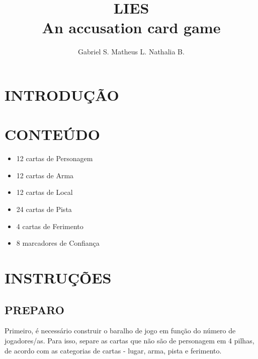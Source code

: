 \documentclass[a4paper, 11pt]{article}
\title{\textbf{LIES} \\ \small{An accusation card game}}
\author{Gabriel S. Matheus L. Nathalia B.}
\begin{document}
\maketitle

\newpage

\newpage

\section*{INTRODUÇÃO}


\section*{CONTEÚDO}

	\begin{itemize}

	\item 12 cartas de Personagem

	\item 12 cartas de Arma

	\item 12 cartas de Local

	\item 24 cartas de Pista

	\item 4 cartas de Ferimento

	\item 8 marcadores de Confiança

	\end{itemize}

\section*{INSTRUÇÕES}

\vspace{5mm}


\subsection*{PREPARO}

	Primeiro, é necessário construir o baralho de jogo em função do número de jogadores/as. Para isso, separe as cartas que não são de personagem em 4 pilhas, de acordo com as categorias de cartas - lugar, arma, pista e ferimento. 
\end{document}
